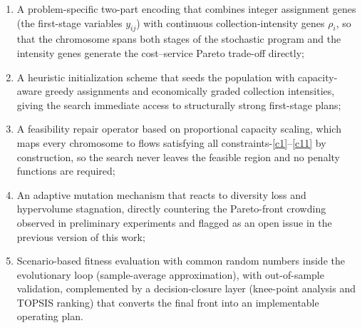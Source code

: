 \documentclass[11pt, a4paper]{article}
\begin{document}
\begin{enumerate}
\def\labelenumi{\arabic{enumi}.}
\item
  A problem-specific two-part encoding that combines integer assignment genes (the first-stage variables $y_{ij}$) with continuous collection-intensity genes $\rho_i$, so that the chromosome spans both stages of the stochastic program and the intensity genes generate the cost--service Pareto trade-off directly;
\item
  A heuristic initialization scheme that seeds the population with capacity-aware greedy assignments and economically graded collection intensities, giving the search immediate access to structurally strong first-stage plans;
\item
  A feasibility repair operator based on proportional capacity scaling, which maps every chromosome to flows satisfying all constraints-\eqref{c1}--\eqref{c11}
  by construction, so the search never leaves the feasible region and no penalty functions are required;
\item
  An adaptive mutation mechanism that reacts to diversity loss and hypervolume stagnation, directly countering the Pareto-front crowding observed in preliminary experiments and flagged as an open issue in the previous version of this work;
\item
  Scenario-based fitness evaluation with common random numbers inside the evolutionary loop (sample-average approximation), with out-of-sample validation, complemented by a decision-closure layer (knee-point analysis and TOPSIS ranking) that converts the final front into an implementable operating plan.
\end{enumerate}
\end{document}
